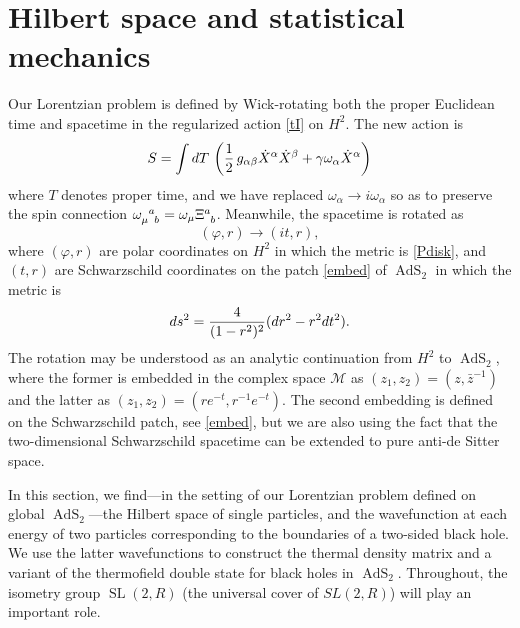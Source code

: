 \documentclass[12pt]{article}
\newcommand{\be}{\begin{equation}}
\newcommand{\ee}{\end{equation}}
\newcommand{\lt}{\left}
\newcommand{\rt}{\right}
\newcommand{\vp}{\varphi}
\newcommand{\calM}{\mathcal{M}}
\newcommand{\RR}{\mathbb{R}}
\DeclareMathOperator{\SL}{SL}
\DeclareMathOperator{\tSL}{\widetilde{\mathrm{SL}}}
\DeclareMathOperator{\tAdS}{\widetilde{AdS}}
\DeclareMathOperator{\HH}{H}
\newcommand{\al}{\alpha}
\newcommand{\bt}{\beta}
\newcommand{\om}{\omega}
\newcommand{\ga}{\gamma}
\newcommand{\ov}{\over}
\def\widetilde#1{#1}%
\def\HH{H}
\def\SL{SL}
\def\RR{R}
\begin{document}
\section{Hilbert space and statistical mechanics}

Our Lorentzian problem is defined by Wick-rotating both the proper Euclidean time and spacetime in the regularized action \eqref{tI} on $\HH^2$. The new action is 
\be \label{LorS}
S=\int dT\, \lt( {1 \ov 2}\,g_{\al\bt}\dot{X}^{\al}\dot{X}^{\bt}+ \ga \om_{\al}\dot{X}^{\al}\rt)
\ee
where $T$ denotes proper time,  and we have replaced $\omega_{\al}\to i\omega_{\al}$ so as to preserve the spin connection $\tensor{\omega}{_\mu^a_b}=\omega_{\mu}\tensor{\Xi}{^a_b}$. Meanwhile, the spacetime is rotated as
\be \label{dgcont}
(\vp,r) \to (it,r),
\ee
where $(\vp,r)$ are polar coordinates on $\HH^2$ in which the metric is \eqref{Pdisk}, and $(t,r)$ are Schwarzschild coordinates on the patch \eqref{embed} of $\tAdS_2$ in which the metric is
\be \label{Smetric}
 ds^2={4 \ov (1-r^2)^2}(dr^2-r^2 dt^2).
\ee
The rotation may be understood as an analytic continuation from $\HH^2$ to $\tAdS_2$, where the former is embedded in the complex space $\calM$ as $(z_1, z_2)=(z, \bar{z}^{-1})$ and the latter as $(z_1,z_2)=(re^{-t},r^{-1}e^{-t})$. The second embedding is defined on the Schwarzschild patch, see \eqref{embed}, but we are also using the fact that the two-dimensional Schwarzschild spacetime can be extended to pure anti-de Sitter space.

In this section, we find---in the setting of our Lorentzian problem defined on global $\tAdS_2$---the Hilbert space of single particles, and the wavefunction at each energy of two particles corresponding to the boundaries of a two-sided black hole. We use the latter wavefunctions to construct the thermal density matrix and a variant of the thermofield double state for black holes in $\tAdS_2$. Throughout, the isometry group $\tSL(2,\RR)$ (the universal cover of $\SL(2,\RR)$) will play an important role.
\end{document}

